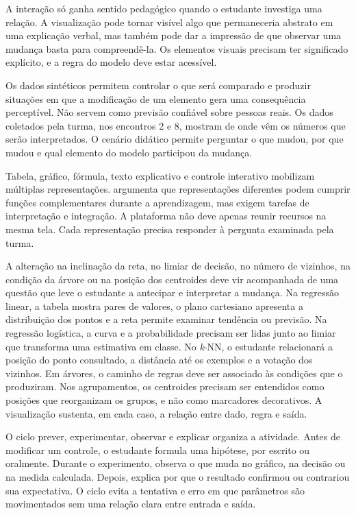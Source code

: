 A interação só ganha sentido pedagógico quando o estudante investiga uma relação. A visualização pode tornar visível algo que permaneceria abstrato em uma explicação verbal, mas também pode dar a impressão de que observar uma mudança basta para compreendê-la. Os elementos visuais precisam ter significado explícito, e a regra do modelo deve estar acessível.

Os dados sintéticos permitem controlar o que será comparado e produzir situações em que a modificação de um elemento gera uma consequência perceptível. Não servem como previsão confiável sobre pessoas reais. Os dados coletados pela turma, nos encontros 2 e 8, mostram de onde vêm os números que serão interpretados. O cenário didático permite perguntar o que mudou, por que mudou e qual elemento do modelo participou da mudança.

Tabela, gráfico, fórmula, texto explicativo e controle interativo mobilizam múltiplas representações.  argumenta que representações diferentes podem cumprir funções complementares durante a aprendizagem, mas exigem tarefas de interpretação e integração. A plataforma não deve apenas reunir recursos na mesma tela. Cada representação precisa responder à pergunta examinada pela turma.

A alteração na inclinação da reta, no limiar de decisão, no número de vizinhos, na condição da árvore ou na posição dos centroides deve vir acompanhada de uma questão que leve o estudante a antecipar e interpretar a mudança. Na regressão linear, a tabela mostra pares de valores, o plano cartesiano apresenta a distribuição dos pontos e a reta permite examinar tendência ou previsão. Na regressão logística, a curva e a probabilidade precisam ser lidas junto ao limiar que transforma uma estimativa em classe. No \textit{k}-NN, o estudante relacionará a posição do ponto consultado, a distância até os exemplos e a votação dos vizinhos. Em árvores, o caminho de regras deve ser associado às condições que o produziram. Nos agrupamentos, os centroides precisam ser entendidos como posições que reorganizam os grupos, e não como marcadores decorativos. A visualização sustenta, em cada caso, a relação entre dado, regra e saída.

O ciclo prever, experimentar, observar e explicar organiza a atividade. Antes de modificar um controle, o estudante formula uma hipótese, por escrito ou oralmente. Durante o experimento, observa o que muda no gráfico, na decisão ou na medida calculada. Depois, explica por que o resultado confirmou ou contrariou sua expectativa. O ciclo evita a tentativa e erro em que parâmetros são movimentados sem uma relação clara entre entrada e saída.

